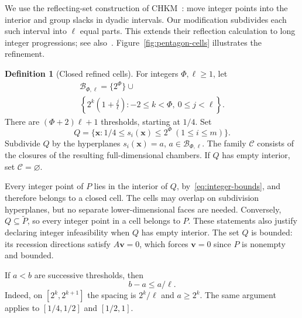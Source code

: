 \documentclass[final,5p,times,twocolumn]{elsarticle}
\theoremstyle{definition}\newtheorem{definition}{Definition}[section]
\theoremstyle{remark}\newtheorem{remark}[theorem]{Remark}
\begin{document}
We use the reflecting-set construction of CHKM~\cite[proof of Theorem~2.1, pp.~29--30]{CHKM}: move integer points into the interior and group slacks in dyadic intervals. Our modification subdivides each such interval into $\ell$ equal parts. This extends their reflection calculation to long integer progressions; see also~\cite[Theorem~2.2]{AH}. Figure~\ref{fig:pentagon-cells} illustrates the refinement.

\begin{definition}[Closed refined cells]\label{def:thresholds}
For integers $\Phi,\ell\ge1$, let
\begin{equation}\label{eq:thresholds}
\begin{split}
\mathcal B_{\Phi,\ell}=\{2^\Phi\}\cup\\
 \left\{2^k\left(1+\frac j\ell\right):-2\le k<\Phi,\ 0\le j<\ell\right\}.
\end{split}
\end{equation}
There are $(\Phi+2)\ell+1$ thresholds, starting at $1/4$. Set
\[
 Q=\{\mathbf{x}:1/4\le s_i(\mathbf{x})\le2^\Phi\ (1\le i\le m)\}.
\]
Subdivide $Q$ by the hyperplanes $s_i(\mathbf{x})=a$, $a\in\mathcal B_{\Phi,\ell}$. The family $\mathcal C$ consists of the closures of the resulting full-dimensional chambers. If $Q$ has empty interior, set $\mathcal C=\varnothing$.
\end{definition}

Every integer point of $P$ lies in the interior of $Q$, by~\eqref{eq:integer-bounds}, and therefore belongs to a closed cell. The cells may overlap on subdivision hyperplanes, but no separate lower-dimensional faces are needed. Conversely, $Q\subseteq\widetilde P$, so every integer point in a cell belongs to $P$. These statements also justify declaring integer infeasibility when $Q$ has empty interior. The set $Q$ is bounded: its recession directions satisfy $A\mathbf v=0$, which forces $\mathbf v=0$ since $P$ is nonempty and bounded.

If $a<b$ are successive thresholds, then
\begin{equation}\label{eq:width}
 b-a\le a/\ell.
\end{equation}
Indeed, on $[2^k,2^{k+1}]$ the spacing is $2^k/\ell$ and $a\ge2^k$. The same argument applies to $[1/4,1/2]$ and $[1/2,1]$.
\end{document}
